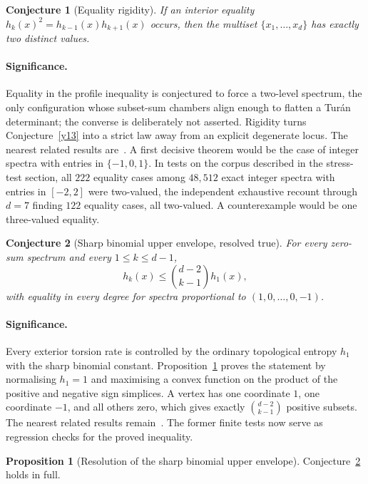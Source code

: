 \documentclass[11pt]{article}
\newtheorem{conjecture}{Conjecture}
\theoremstyle{definition}
\newtheorem{proposition}{Proposition}
\begin{document}
\begin{conjecture}[Equality rigidity]\label{y14}
If an interior equality $h_k(x)^2=h_{k-1}(x)h_{k+1}(x)$ occurs, then the multiset $\{x_1,\ldots,x_d\}$ has exactly two distinct values.
\end{conjecture}

\paragraph{Significance.}
Equality in the profile inequality is conjectured to force a two-level spectrum, the only configuration whose subset-sum chambers align enough to flatten a Tur\'an determinant; the converse is deliberately not asserted.  Rigidity turns Conjecture~\ref{y13} into a strict law away from an explicit degenerate locus.  The nearest related results are~\cite{BV13,BLP10}.  A first decisive theorem would be the case of integer spectra with entries in $\{-1,0,1\}$.  In tests on the corpus described in the stress-test section, all $222$ equality cases among $48{,}512$ exact integer spectra with entries in $[-2,2]$ were two-valued, the independent exhaustive recount through $d=7$ finding $122$ equality cases, all two-valued.  A counterexample would be one three-valued equality.

\begin{conjecture}[Sharp binomial upper envelope, resolved true]\label{y15}
For every zero-sum spectrum and every $1\le k\le d-1$,
\[
h_k(x)\le\binom{d-2}{k-1}h_1(x),
\]
with equality in every degree for spectra proportional to $(1,0,\ldots,0,-1)$.
\end{conjecture}

\paragraph{Significance.}
Every exterior torsion rate is controlled by the ordinary topological entropy $h_1$ with the sharp binomial constant.  Proposition~\ref{y:upper} proves the statement by normalising $h_1=1$ and maximising a convex function on the product of the positive and negative sign simplices.  A vertex has one coordinate $1$, one coordinate $-1$, and all others zero, which gives exactly $\binom{d-2}{k-1}$ positive subsets.  The nearest related results remain~\cite{BV13,BLP10}.  The former finite tests now serve as regression checks for the proved inequality.

\begin{proposition}[Resolution of the sharp binomial upper envelope]\label{y:upper}
Conjecture~\ref{y15} holds in full.
\end{proposition}
\end{document}
